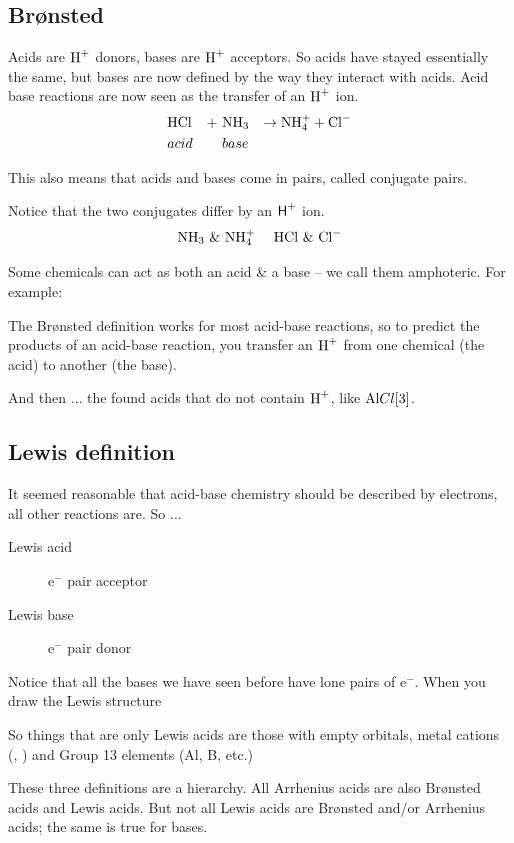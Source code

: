 \documentclass[
	chapter=4
]{chem122notes}
\begin{document}
\subsection{Br\o{}nsted}\label{subsec:bronsted}
Acids are $\element{H}^{+}$ donors, bases are $\element{H}^{+}$ acceptors.
So acids have stayed essentially the same, but bases are now defined by the way they interact with acids.
Acid base reactions are now seen as the transfer of an $\element{H}^{+}$ ion.
\begin{equation*}
\begin{aligned}
	&\element{H}\element{Cl}& +\ &\element{N}\element{H}[3]& \rightarrow \element{N}\element{H}[4]^{+} + \element{Cl}^{-}\\
	&acid& &base&
\end{aligned}
\end{equation*}

This also means that acids and bases come in pairs, called conjugate pairs.

Notice that the two conjugates differ by an $\ce{H+}$ ion.
\[ \element{N}\element{H}[3]\ \&\ \element{N}\element{H}[4]^{+}\ \ \ \ \element{H}\element{Cl}\ \&\ \element{Cl}^{-} \]

Some chemicals can act as both an acid \& a base -- we call them amphoteric.
For example:

The Br\o{}nsted definition works for most acid-base reactions, so to predict the products of an acid-base reaction, you transfer an $\element{H}^{+}$ from one chemical (the acid) to another (the base).

And then $\dots$ the found acids that do not contain $\element{H}^{+}$, like $\element{Al}{Cl}[3]$.

\subsection{Lewis definition}\label{subsec:lewis-definition}
It seemed reasonable that acid-base chemistry should be described by electrons, all other reactions are.
So $\dots$
\begin{description}
	\item[Lewis acid] $\mbox{e}^{-}$ pair acceptor
	\item[Lewis base] $\mbox{e}^{-}$ pair donor
\end{description}
Notice that all the bases we have seen before have lone pairs of $\mbox{e}^{-}$.
When you draw the Lewis structure

So things that are only Lewis acids are those with empty orbitals, metal cations (, ) and Group 13 elements (Al, B, etc.)

These three definitions are a hierarchy.
All Arrhenius acids are also Br\o{}nsted acids and Lewis acids.
But not all Lewis acids are Br\o{}nsted and/or Arrhenius acids;
the same is true for bases.
\end{document}
